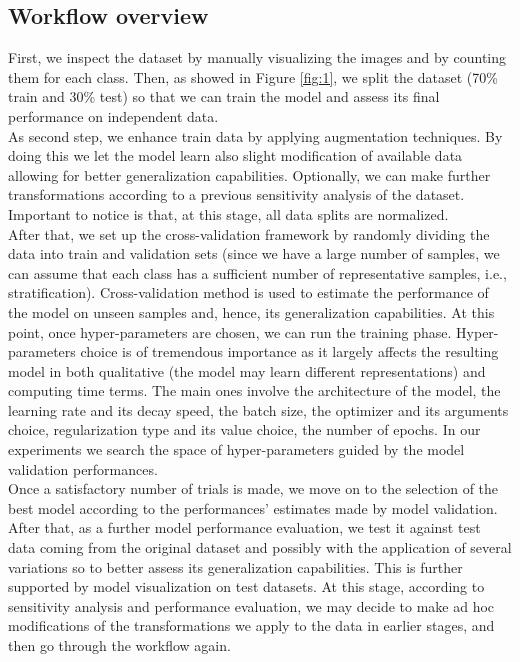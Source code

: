 \subsection{Workflow overview}
First, we inspect the dataset by manually visualizing the images and by counting them for each class. Then, as showed in Figure \ref{fig:1}, we split the dataset (70\% train and 30\% test) so that we can train the model and assess its final performance on independent data.
\\\indent
As second step, we enhance train data by applying augmentation techniques. By doing this we let the model learn also slight modification of available data allowing for better generalization capabilities. Optionally, we can make further transformations according to a previous sensitivity analysis of the dataset. Important to notice is that, at this stage, all data splits are normalized.
\\\indent
After that, we set up the cross-validation framework by randomly dividing the data into train and validation sets (since we have a large number of samples, we can assume that each class has a sufficient number of representative samples, i.e., stratification). Cross-validation method is used to estimate the performance of the model on unseen samples and, hence, its generalization capabilities. At this point, once hyper-parameters are chosen, we can run the training phase. Hyper-parameters choice is of tremendous importance as it largely affects the resulting model in both qualitative (the model may learn different representations) and computing time terms. The main ones involve the architecture of the model, the learning rate and its decay speed, the batch size, the optimizer and its arguments choice, regularization type and its value choice, the number of epochs. In our experiments we search the space of hyper-parameters guided by the model validation performances.
\\\indent
Once a satisfactory number of trials is made, we move on to the selection of the best model according to the performances' estimates made by model validation. After that, as a further model performance evaluation, we test it against test data coming from the original dataset and possibly with the application of several  variations so to better assess its generalization capabilities. This is further supported by model visualization on test datasets. At this stage, according to sensitivity analysis and performance evaluation, we may decide to make ad hoc modifications of the transformations we apply to the data in earlier stages, and then go through the workflow again.
